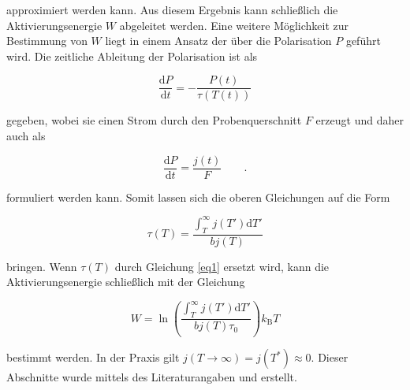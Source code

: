 approximiert werden kann.
Aus diesem Ergebnis kann schließlich die Aktivierungsenergie $W$ abgeleitet werden.
Eine weitere Möglichkeit zur Bestimmung von $W$ liegt in einem Ansatz der über 
die Polarisation $P$ geführt wird.
Die zeitliche Ableitung der Polarisation ist als

\begin{equation*}
    \frac{\mathrm{d}P}{\mathrm{d}t} = - \frac{ P(t) }{ \tau(T(t))}
\end{equation*}

gegeben, wobei sie einen Strom durch den Probenquerschnitt $F$ erzeugt und daher auch als

\begin{equation*}
    \frac{\mathrm{d}P}{\mathrm{d}t} = \frac{j(t)}{F} \qquad.
\end{equation*}

formuliert werden kann.
Somit lassen sich die oberen Gleichungen auf die Form 

\begin{equation*}
    \tau(T) = \frac{ \int_{T}^\infty j(T') \mathrm{d}T' }{ b j(T) } 
\end{equation*}

bringen. Wenn $\tau(T)$ durch Gleichung \eqref{eq1} ersetzt wird, kann 
die Aktivierungsenergie schließlich mit der Gleichung

\begin{equation}
    W = \ln{ \left( \frac{ \int_{T}^\infty j(T') \mathrm{d}T' }{ b j(T) \tau_{\text{0}} } \right) }k_{\mathrm{B}} T
    \label{eq3}
\end{equation}

bestimmt werden. In der Praxis gilt
$j(T \to \infty) = j(T^*)  \approx 0$.
Dieser Abschnitte wurde mittels des Literaturangaben 
\cite{Bucci}
\cite{Fuller}
\cite{Muccillo}
und
\cite{Becker}
erstellt.
\newpage